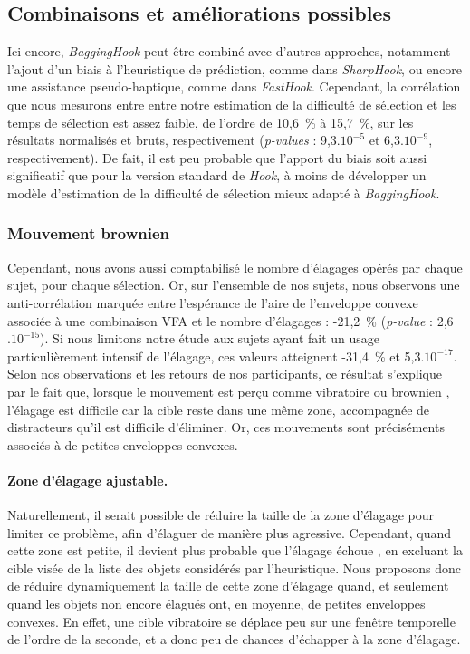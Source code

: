 	\subsection{Combinaisons et améliorations possibles}
	Ici encore, \emph{BaggingHook} peut être combiné avec d'autres approches, notamment l'ajout d'un biais à l'heuristique de prédiction, comme dans \emph{SharpHook}, ou encore une assistance pseudo-haptique, comme dans \emph{FastHook}. Cependant, la corrélation que nous mesurons entre entre notre estimation de la difficulté de sélection et les temps de sélection est assez faible, de l'ordre de 10,6~\%{} à 15,7~\%{}, sur les résultats normalisés et bruts, respectivement (\emph{p-values} : 9,3$.10^{-5}$ et 6,3$.10^{-9}$, respectivement). De fait, il est peu probable que l'apport du biais soit aussi significatif que pour la version standard de \emph{Hook}, à moins de développer un modèle d'estimation de la difficulté de sélection mieux adapté à \emph{BaggingHook}.
	
	\subsubsection{Mouvement brownien}
	Cependant, nous avons aussi comptabilisé le nombre d'élagages opérés par chaque sujet, pour chaque sélection. Or, sur l'ensemble de nos sujets, nous observons une anti-corrélation marquée entre l'espérance de l'aire de l'enveloppe convexe associée à une combinaison VFA et le nombre d'élagages : -21,2~\%{} (\emph{p-value} : 2,6$.10^{-15}$). Si nous limitons notre étude aux sujets ayant fait un usage particulièrement intensif de l'élagage, ces valeurs atteignent -31,4~\%{} et 5,3$.10^{-17}$. Selon nos observations et les retours de nos participants, ce résultat s'explique par le fait que, lorsque le mouvement est perçu comme \og vibratoire \fg{} ou \og brownien \fg{}, l'élagage est difficile car la cible reste dans une même zone, accompagnée de distracteurs qu'il est difficile d'éliminer. Or, ces mouvements sont préciséments associés à de petites enveloppes convexes.
	
	\paragraph{Zone d'élagage ajustable.}
	Naturellement, il serait possible de réduire la taille de la zone d'élagage pour limiter ce problème, afin d'élaguer de manière plus agressive. Cependant, quand cette zone est petite, il devient plus probable que l'élagage \og échoue \fg{}, en excluant la cible visée de la liste des objets considérés par l'heuristique. Nous proposons donc de réduire dynamiquement la taille de cette zone d'élagage quand, et seulement quand les objets non encore élagués ont, en moyenne, de petites enveloppes convexes. En effet, une cible vibratoire se déplace peu sur une fenêtre temporelle de l'ordre de la seconde, et a donc peu de chances d'échapper à la zone d'élagage.
	
